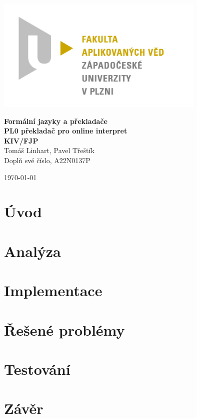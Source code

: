 \documentclass[12pt, letterpaper]{article}
\begin{document}
\begin{titlepage}
\centerline{\includegraphics[width=10cm]{img/logo.jpg}}
\begin{center}
\vspace{30px}
{\huge
\textbf{Formální jazyky a překladače}\\
\textbf{PL0 překladač pro online interpret}\\
\vspace{1cm}
}
{\large
\textbf{KIV/FJP}\\
\vspace{1cm}
}
\vspace{1cm}
{\large
Tomáš Linhart, Pavel Třeštík\\
}
{\normalsize
Doplň své číslo, A22N0137P
}
\end{center}
\vspace{\fill}
\hfill
\begin{minipage}[t]{7cm}
\flushright
\today
\end{minipage}
\end{titlepage}
\section{Úvod}
%
\section{Analýza}
%
\section{Implementace}
%
\section{Řešené problémy}
%
\section{Testování}
%
\section{Závěr}
\end{document}
